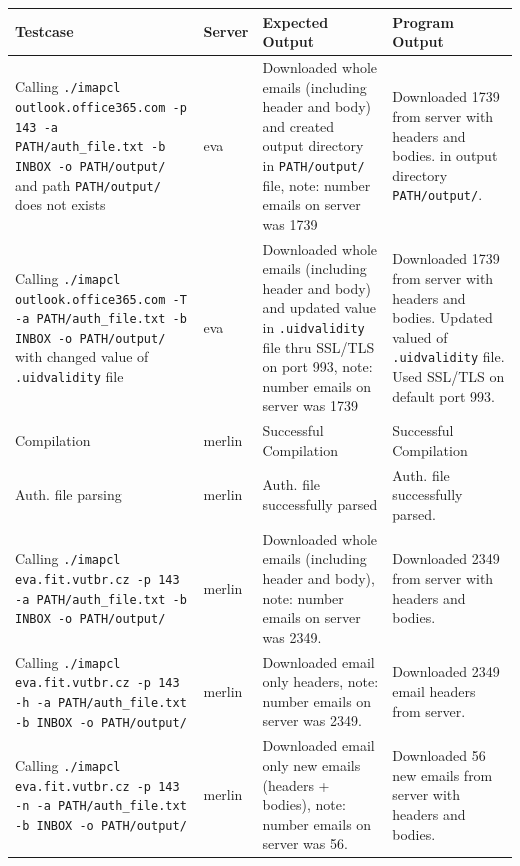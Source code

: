 \documentclass[a4paper,11pt]{article}
\begin{document}
\begin{center}
    \vspace{0.5cm} %
    \begin{tabularx}{\textwidth}{|>{\raggedright\arraybackslash}p{5cm}|>{\raggedright\arraybackslash}p{1cm}|>{\raggedright\arraybackslash}p{5cm}|>{\raggedright\arraybackslash}X|}
        \hline
        \textbf{Testcase} & \textbf{Server} & \textbf{Expected Output} & \textbf{Program Output} \\
        \hline
        Calling \texttt{./imapcl outlook.office365.com -p 143 -a PATH/auth\_file.txt -b INBOX -o PATH/output/} and path \texttt{PATH/output/} does not exists & eva & Downloaded whole emails (including header and body) and created output directory in \texttt{PATH/output/} file, note: number emails on server was 1739 & Downloaded 1739 from server with headers and bodies. in output directory \texttt{PATH/output/}. \\
        \hline
        Calling \texttt{./imapcl outlook.office365.com -T -a PATH/auth\_file.txt -b INBOX -o PATH/output/} with changed value of \texttt{.uidvalidity} file & eva & Downloaded whole emails (including header and body) and updated value in \texttt{.uidvalidity} file thru SSL/TLS on port 993, note: number emails on server was 1739 & Downloaded 1739 from server with headers and bodies. Updated valued of \texttt{.uidvalidity} file. Used SSL/TLS on default port 993.\\
        \hline
        Compilation & merlin & Successful Compilation & Successful Compilation \\
        \hline
        Auth. file parsing & merlin & Auth. file successfully parsed & Auth. file successfully parsed. \\
        \hline
        Calling \texttt{./imapcl eva.fit.vutbr.cz -p 143 -a PATH/auth\_file.txt -b INBOX -o PATH/output/} & merlin & Downloaded whole emails (including header and body), note: number emails on server was 2349. & Downloaded 2349 from server with headers and bodies. \\
        \hline
        Calling \texttt{./imapcl eva.fit.vutbr.cz -p 143 -h -a PATH/auth\_file.txt -b INBOX -o PATH/output/} & merlin & Downloaded email only headers, note: number emails on server was 2349. & Downloaded 2349 email headers from server. \\
        \hline
        Calling \texttt{./imapcl eva.fit.vutbr.cz -p 143 -n -a PATH/auth\_file.txt -b INBOX -o PATH/output/} & merlin & Downloaded email only new emails (headers + bodies), note: number emails on server was 56. & Downloaded 56 new emails from server with headers and bodies. \\

\end{tabularx}
\end{center}
\end{document}
